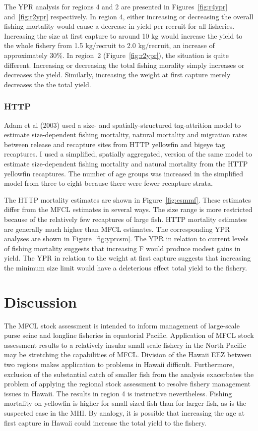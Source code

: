 \documentclass[12pt,letterpaper]{article}
\begin{document}
The YPR analysis for regions 4 and 2 are
presented in Figures~\ref{fig:r4ypr} and~\ref{fig:r2ypr} respectively.
In region 4, either increasing or decreasing the overall fishing
mortality would cause a decrease in yield per recruit for all
fisheries.
Increasing the size at first capture to around 10 kg would increase the
yield to the whole fishery from 1.5 kg/recruit to 2.0
kg/recruit, an increase of approximately 30\%.
In region~2 (Figure~\ref{fig:r2ypr}), the situation is quite different. 
Increasing or decreasing the total fishing morality simply increases
or decreases the yield.
Similarly, increasing the weight at first capture merely decreases the
the total yield.

\subsubsection*{HTTP}
Adam et al (2003) used a size- and spatially-structured
tag-attrition model to estimate
size-dependent fishing mortality, natural
mortality and migration rates between release and recapture sites from
HTTP yellowfin and bigeye tag recaptures. 
I used a simplified, spatially aggregated, version of the same
model to estimate size-dependent fishing
mortality and natural mortality from the HTTP yellowfin recaptures.
The number of age groups was increased in the simplified model
from three to
eight because there were fewer recapture strata.

The HTTP mortality estimates are shown in Figure~\ref{fig:csmmf}.
These estimates differ from the MFCL estimates in several ways. The
size range is more restricted because of the relatively few
recaptures of large fish. HTTP mortality estimates
are generally much higher than MFCL estimates.
The corresponding YPR analyses are shown in Figure~\ref{fig:yprcsm}.
The YPR in relation to current levels of fishing mortality suggests
that increasing F would produce modest gains in yield.
The YPR in relation to the weight at first capture suggests that
increasing the minimum size limit would have a deleterious effect
total yield to the fishery.


\section*{Discussion}
The MFCL stock assessment is intended to inform management of
large-scale purse seine and longline fisheries in equatorial Pacific.
Application of MFCL stock assessment results to a relatively insular
small scale fishery in the North Pacific may be stretching the
capabilities of MFCL. Division of the Hawaii EEZ between two regions
makes application to problems in Hawaii difficult. Furthermore,
exclusion of the substantial catch of smaller fish from the analysis exacerbates
the problem of applying the regional stock assessment to
resolve fishery management issues in Hawaii. The results in region 4
is instructive nevertheless.
Fishing mortality on yellowfin is higher for small-sized fish than for
larger fish, as is the suspected case in the MHI. By analogy, it is
possible that increasing the age at first capture in Hawaii could increase
the total yield to the fishery. 
\end{document}
